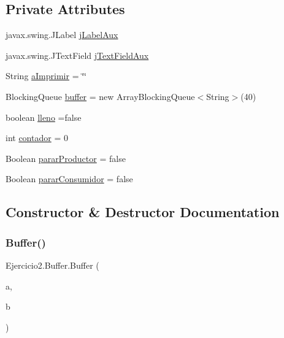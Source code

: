 \subsection*{Private Attributes}
\begin{DoxyCompactItemize}
\item 
javax.\+swing.\+J\+Label \mbox{\hyperlink{class_ejercicio2_1_1_buffer_a032718b3d95a8db4bc7846846134e4e6}{j\+Label\+Aux}}
\item 
javax.\+swing.\+J\+Text\+Field \mbox{\hyperlink{class_ejercicio2_1_1_buffer_a33d8699257b7b05f8023b7a49f7ef7e0}{j\+Text\+Field\+Aux}}
\item 
String \mbox{\hyperlink{class_ejercicio2_1_1_buffer_a3911e1d692d0ca6955a96604bf0abada}{a\+Imprimir}} = \char`\"{}\char`\"{}
\item 
Blocking\+Queue \mbox{\hyperlink{class_ejercicio2_1_1_buffer_a63ddce4482528c08b1023ab9ea3842ce}{buffer}} = new Array\+Blocking\+Queue$<$String$>$(40)
\item 
boolean \mbox{\hyperlink{class_ejercicio2_1_1_buffer_a2f6412c605d99ad74a4f325e5d8b0385}{lleno}} =false
\item 
int \mbox{\hyperlink{class_ejercicio2_1_1_buffer_a323b888df0fbc24a4fd9da8dd1960639}{contador}} = 0
\item 
Boolean \mbox{\hyperlink{class_ejercicio2_1_1_buffer_a519b556e9529e75803b99114dbdd0eab}{parar\+Productor}} = false
\item 
Boolean \mbox{\hyperlink{class_ejercicio2_1_1_buffer_ace8c2a56a3fa5d45cf9e3d979c5f9d17}{parar\+Consumidor}} = false
\end{DoxyCompactItemize}


\subsection{Constructor \& Destructor Documentation}
\mbox{\label{class_ejercicio2_1_1_buffer_a3d628b4ba6b253cceefa6455fa44f164}} 
\subsubsection{\texorpdfstring{Buffer()}{Buffer()}}
{\footnotesize\ttfamily Ejercicio2.\+Buffer.\+Buffer (\begin{DoxyParamCaption}\item[{javax.\+swing.\+J\+Label}]{a,  }\item[{javax.\+swing.\+J\+Text\+Field}]{b }\end{DoxyParamCaption})\hspace{0.3cm}{\ttfamily [inline]}}



